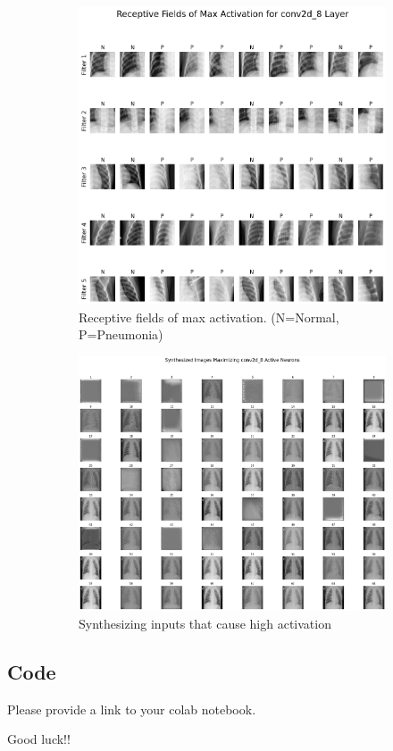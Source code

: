 \documentclass{article}
\begin{document}
\begin{figure}
     \centering
     \begin{subfigure}[b]{0.45\textwidth}
         \centering
         \includegraphics[width=1.0\linewidth, angle=0]{receptive_fields.png}
          \caption{Receptive fields of max activation. (N=Normal, P=Pneumonia)}
          \label{fig:receptive_fields}
     \end{subfigure}
     \hfill
     \begin{subfigure}[b]{0.45\textwidth}
         \centering
         \includegraphics[width=1.1\linewidth, angle=0]{synth_images.png}
          \caption{Synthesizing inputs that cause high activation}
          \label{fig:synth_images}
     \end{subfigure}
     
        \caption{}
        \label{fig:three Explainability approaches}
\end{figure}


\subsection{Code}

Please provide a link to your colab notebook.

Good luck!!


\end{document}
